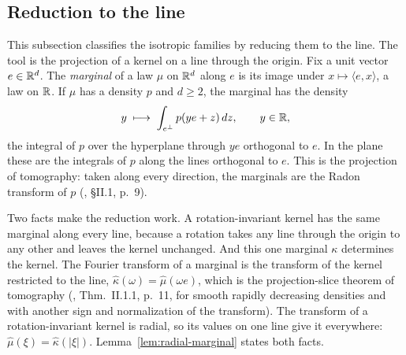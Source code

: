 \subsection{Reduction to the line}\label{sec:isotropic-reduction}

This subsection classifies the isotropic families by reducing them to the line. The tool is the
projection of a kernel on a line through the origin. Fix a unit vector $e \in \mathbb{R}^d$. The
\emph{marginal} of a law $\mu$ on $\mathbb{R}^d$ along $e$ is its image under
$x \mapsto \langle e, x\rangle$, a law on $\mathbb{R}$. If $\mu$ has a density $p$ and $d \ge 2$, the
marginal has the density
\[
  y \;\longmapsto\; \int_{e^\perp} p(ye + z)\,dz , \qquad y \in \mathbb{R} ,
\]
the integral of $p$ over the hyperplane through $ye$ orthogonal to $e$. In the plane these are the
integrals of $p$ along the lines orthogonal to $e$. This is the projection of tomography: taken
along every direction, the marginals are the Radon transform of $p$
(, \S II.1, p.~9).

Two facts make the reduction work. A rotation-invariant kernel has the same marginal along every
line, because a rotation takes any line through the origin to any other and leaves the kernel
unchanged. And this one marginal $\kappa$ determines the kernel. The Fourier transform of a
marginal is the transform of the kernel restricted to the line,
$\widehat\kappa(\omega) = \widehat\mu(\omega e)$, which is the projection-slice theorem of
tomography (, Thm.~II.1.1, p.~11, for smooth rapidly decreasing
densities and with another sign and normalization of the transform). The transform of a rotation-invariant kernel is radial, so its values on one line give
it everywhere: $\widehat\mu(\xi) = \widehat\kappa(|\xi|)$. Lemma~\ref{lem:radial-marginal} states
both facts.

